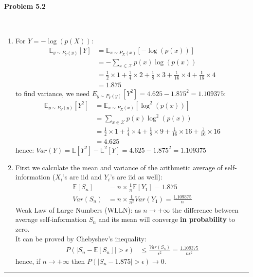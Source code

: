 \documentclass[12pt, letterpaper]{scrartcl}
\begin{document}
\paragraph*{Problem 5.2} \hfill\\
\begin{enumerate}[((a))]
    \item For $Y=-\log(p(X))$:
    \begin{align*}
        \mathbb{E}_{y\sim P_Y(y)}[Y]&=\mathbb{E}_{x\sim P_X(x)}[-\log(p(x))]\\
        &=-\sum_{x\in \mathcal{X}}p(x)\log(p(x))\\
        &=\frac{1}{2}\times1+\frac{1}{4}\times2+\frac{1}{8}\times3+\frac{1}{16}\times4+\frac{1}{16}\times4\\
        &=1.875
    \end{align*}
    to find variance, we need $E_{y\sim P_Y(y)}[Y^2]=4.625-1.875^2=1.109375$:
    \begin{align*}
        \mathbb{E}_{y\sim P_Y(y)}[Y^2]&=\mathbb{E}_{x\sim P_X(x)}[\log^2(p(x))]\\
        &=\sum_{x\in \mathcal{X}}p(x)\log^2(p(x))\\
        &=\frac{1}{2}\times1+\frac{1}{4}\times4+\frac{1}{8}\times9+\frac{1}{16}\times16+\frac{1}{16}\times16\\
        &=4.625
    \end{align*}
    hence: $Var(Y)=\mathbb{E}[Y^2]-\mathbb{E}^2[Y]=4.625-1.875^2=1.109375$
    \item
    First we calculate the mean and variance of the arithmetic average of self-information ($X_i$'s are iid and $Y_i$'s are iid as well):
    \begin{align*}
        \mathbb{E}[S_n]&=n\times\frac{1}{n}\mathbb{E}[Y_1]=1.875\\
        Var(S_n)&=n\times\frac{1}{n^2}Var(Y_1)=\frac{1.109375}{n}
    \end{align*}
    Weak Law of Large Numbers (WLLN): as $n\rightarrow+\infty$ the difference between average self-information $S_n$ and its mean will converge \textbf{in probability} to zero.\\
    It can be proved by Chebyshev's inequality:
    \begin{align*}
        P(|S_n-\mathbb{E}[S_n]|>\epsilon)&\leq\frac{Var(S_n)}{\epsilon^2}=\frac{1.109375}{n\epsilon^2}
    \end{align*}
    hence, if $n\rightarrow+\infty$ then $P(|S_n-1.875|>\epsilon)\rightarrow0$.
\end{enumerate}
\hrule
\end{document}
